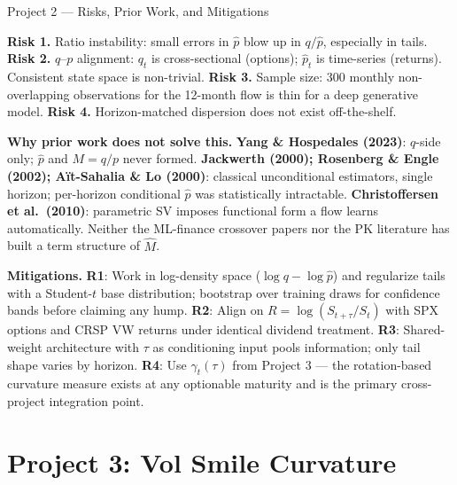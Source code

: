 \documentclass[aspectratio=169, 11pt]{beamer}
\newcommand{\riskbox}[1]{%
  \begin{tcolorbox}[colback=accentred!8,colframe=accentred,boxrule=0.8pt,arc=2pt,left=4pt,right=4pt,top=2pt,bottom=2pt]
    #1\end{tcolorbox}}
\newcommand{\fixbox}[1]{%
  \begin{tcolorbox}[colback=accentblue!8,colframe=accentblue,boxrule=0.8pt,arc=2pt,left=4pt,right=4pt,top=2pt,bottom=2pt]
    #1\end{tcolorbox}}
\begin{document}
\begin{frame}{Project 2 --- Risks, Prior Work, and Mitigations}
\footnotesize

\riskbox{\textbf{Risk 1.} Ratio instability: small errors in $\hat{p}$ blow up in $q/\hat{p}$, especially in tails.
\quad\textbf{Risk 2.} $q$--$p$ alignment: $q_t$ is cross-sectional (options); $\hat{p}_t$ is time-series (returns). Consistent state space is non-trivial.
\quad\textbf{Risk 3.} Sample size: 300 monthly non-overlapping observations for the 12-month flow is thin for a deep generative model.
\quad\textbf{Risk 4.} Horizon-matched dispersion does not exist off-the-shelf.}

\vspace{0.1cm}
\textbf{Why prior work does not solve this.}
\textbf{Yang \& Hospedales (2023)}: $q$-side only; $\hat{p}$ and $M=q/p$ never formed.
\textbf{Jackwerth (2000); Rosenberg \& Engle (2002); A\"it-Sahalia \& Lo (2000)}: classical unconditional estimators, single horizon; per-horizon conditional $\hat{p}$ was statistically intractable.
\textbf{Christoffersen et al.\ (2010)}: parametric SV imposes functional form a flow learns automatically.
Neither the ML-finance crossover papers nor the PK literature has built a term structure of $\hat{M}$.

\vspace{0.1cm}
\fixbox{\textbf{Mitigations.}
\textbf{R1}: Work in log-density space ($\log q - \log \hat{p}$) and regularize tails with a Student-$t$ base distribution; bootstrap over training draws for confidence bands before claiming any hump.
\textbf{R2}: Align on $R = \log(S_{t+\tau}/S_t)$ with SPX options and CRSP VW returns under identical dividend treatment.
\textbf{R3}: Shared-weight architecture with $\tau$ as conditioning input pools information; only tail shape varies by horizon.
\textbf{R4}: Use $\gamma_t(\tau)$ from Project 3 --- the rotation-based curvature measure exists at any optionable maturity and is the primary cross-project integration point.}

\end{frame}

\section{Project 3: Vol Smile Curvature}
\end{document}
